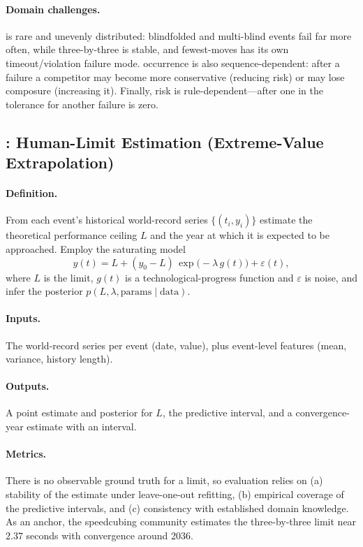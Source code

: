 \paragraph{Domain challenges.}
\DNF{} is rare and unevenly distributed: blindfolded and multi-blind events
fail far more often, while three-by-three is stable, and fewest-moves has its
own timeout/violation failure mode. \DNF{} occurrence is also
sequence-dependent: after a failure a competitor may become more conservative
(reducing risk) or may lose composure (increasing it). Finally, risk is
rule-dependent---after one \DNF{} in  the tolerance for another
failure is zero.

\subsection{: Human-Limit Estimation (Extreme-Value Extrapolation)}
\label{sec:task4}

\paragraph{Definition.}
From each event's historical world-record series
$\{(t_i, y_i)\}$ estimate the theoretical performance ceiling $L$ and the
year at which it is expected to be approached. Employ the saturating model
\begin{equation}
  y(t) = L + (y_0 - L)\,\exp\!\big(-\lambda\, g(t)\big) + \varepsilon(t),
  \label{eq:limit}
\end{equation}
where $L$ is the limit, $g(t)$ is a technological-progress function and
$\varepsilon$ is noise, and infer the posterior $p(L, \lambda, \text{params}
\mid \text{data})$.

\paragraph{Inputs.}
The world-record series per event (date, value), plus event-level features
(mean, variance, history length).

\paragraph{Outputs.}
A point estimate and posterior for $L$, the predictive interval, and a
convergence-year estimate with an interval.

\paragraph{Metrics.}
There is no observable ground truth for a limit, so evaluation relies on
(a) stability of the estimate under leave-one-out refitting, (b) empirical
coverage of the predictive intervals, and (c) consistency with established
domain knowledge. As an anchor, the speedcubing community estimates the
three-by-three limit near $2.37$ seconds with convergence around 2036.

